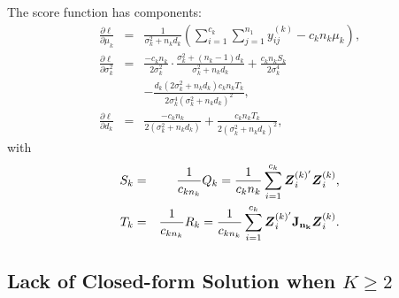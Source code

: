 \documentclass[11pt,a5paper,twoside]{book}
\newcommand{\BZ}{\mbox{\boldmath $Z$}}
\begin{document}
{The score function has components:
\begin{eqnarray}
\frac{\partial \ell}{\partial \mu_k} & =&
\frac{1}{\sigma_k^2+n_kd_k} \left( \sum_{i=1}^{c_k} \sum_{j=1}^{n_1} y_{ij}^{(k)}-c_k n_k \mu_k\right) ,
\label{jscore1} \\
\frac{\partial \ell}{\partial \sigma_k^2} & =&
 \frac{-c_kn_k}{2\sigma_k^2} \cdot \frac{\sigma_k^2+(n_k-1)d_k}{\sigma_k^2+n_k d_k} + \frac{c_kn_kS_k}{2\sigma_k^4}  \\
 &&-\frac{d_k(2\sigma_k^2+n_kd_k) c_kn_kT_k}{2\sigma_k^4(\sigma_k^2+n_kd_k)^2} ,
\label{jscore2}\\
\frac{\partial \ell}{\partial d_k} & = &
\frac{-c_kn_k}{2(\sigma_k^2+n_kd_k)}+\frac{c_kn_k T_k}{2(\sigma_k^2+n_kd_k)^2},
 \label{jscore3}
\end{eqnarray}
with
\begin{eqnarray}
\label{skfunc}\label{qkfunc}
S_k & =& \frac{1}{c_{kn_k}} Q_k= \frac{1}{c_kn_k}\sum_{i=1}^{c_k} \BZ_i^{(k)'}\BZ_i^{(k)}, \\
\label{tkfunc}\label{rkfunc}
T_k & =&\frac{1}{c_{kn_k}}R_k= \frac{1}{c_{kn_k}}\sum_{i=1}^{c_k} \BZ_i^{(k)'}\mathbf{J_{n_k}}\BZ_i^{(k)}.
\end{eqnarray}



\subsection{Lack of Closed-form Solution when $K\ge 2$}
\label{twodifferent}

}
\end{document}
